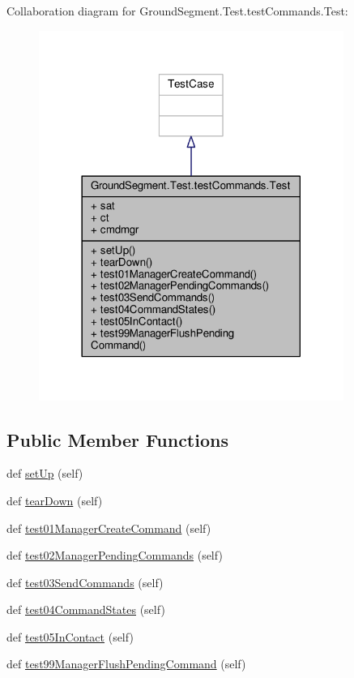 Collaboration diagram for Ground\+Segment.\+Test.\+test\+Commands.\+Test\+:\nopagebreak
\begin{figure}[H]
\begin{center}
\leavevmode
\includegraphics[width=282pt]{class_ground_segment_1_1_test_1_1test_commands_1_1_test__coll__graph}
\end{center}
\end{figure}
\subsection*{Public Member Functions}
\begin{DoxyCompactItemize}
\item 
def \hyperlink{class_ground_segment_1_1_test_1_1test_commands_1_1_test_abe9de965c33fe9e68c5b3918271c2ef8}{set\+Up} (self)
\item 
def \hyperlink{class_ground_segment_1_1_test_1_1test_commands_1_1_test_a2853a07e71eb0ea753a90c0ba68de9ae}{tear\+Down} (self)
\item 
def \hyperlink{class_ground_segment_1_1_test_1_1test_commands_1_1_test_a731fe280c86e51e859518bd327501091}{test01\+Manager\+Create\+Command} (self)
\item 
def \hyperlink{class_ground_segment_1_1_test_1_1test_commands_1_1_test_a770f34e18294dc5fcd67837235b540bf}{test02\+Manager\+Pending\+Commands} (self)
\item 
def \hyperlink{class_ground_segment_1_1_test_1_1test_commands_1_1_test_a248f9d9c74f37ee4aad4bd17e10d18e1}{test03\+Send\+Commands} (self)
\item 
def \hyperlink{class_ground_segment_1_1_test_1_1test_commands_1_1_test_a4bb30e04445ca93f5a141b9c6fadd931}{test04\+Command\+States} (self)
\item 
def \hyperlink{class_ground_segment_1_1_test_1_1test_commands_1_1_test_a6042b8b8bbebfb3ae3c3e28a26cefd86}{test05\+In\+Contact} (self)
\item 
def \hyperlink{class_ground_segment_1_1_test_1_1test_commands_1_1_test_ad0a645d335ce97cde8484be83ca27951}{test99\+Manager\+Flush\+Pending\+Command} (self)
\end{DoxyCompactItemize}
